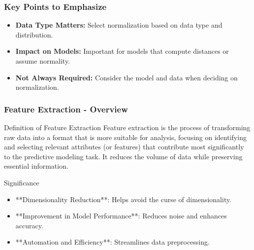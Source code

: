 \documentclass[aspectratio=169]{beamer}
\begin{document}
\begin{frame}[fragile]
    \frametitle{Key Points to Emphasize}
    \begin{itemize}
        \item \textbf{Data Type Matters:} Select normalization based on data type and distribution.
        \item \textbf{Impact on Models:} Important for models that compute distances or assume normality.
        \item \textbf{Not Always Required:} Consider the model and data when deciding on normalization.
    \end{itemize}
\end{frame}

\begin{frame}[fragile]
    \frametitle{Feature Extraction - Overview}
    \begin{block}{Definition of Feature Extraction}
        Feature extraction is the process of transforming raw data into a format that is more suitable for analysis, focusing on identifying and selecting relevant attributes (or features) that contribute most significantly to the predictive modeling task. It reduces the volume of data while preserving essential information.
    \end{block}
    \begin{block}{Significance}
        \begin{itemize}
            \item **Dimensionality Reduction**: Helps avoid the curse of dimensionality.
            \item **Improvement in Model Performance**: Reduces noise and enhances accuracy.
            \item **Automation and Efficiency**: Streamlines data preprocessing.
        \end{itemize}
    \end{block}
\end{frame}
\end{document}

